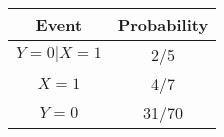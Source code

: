 \begin{tabular}{|c|c|}
\hline
Event	&Probability\\
\hline
$Y = 0|X = 1$	& 2/5 \\
\hline
$X = 1$	& 4/7 \\
\hline
$Y = 0$	& 31/70 \\
\hline
\end{tabular}

